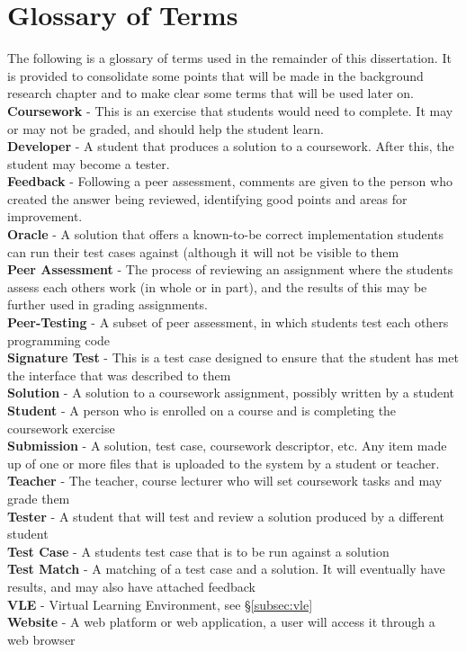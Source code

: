 \documentclass[a4paper,11pt]{report}
\newcommand{\gloss}[2]{\\\textbf{#1} - {#2}}
\begin{document}
\section{Glossary of Terms}
The following is a glossary of terms used in the remainder of this dissertation. It is provided to consolidate some points that will be made in the background research chapter and to make clear some terms that will be used later on.
\gloss{Coursework}{This is an exercise that students would need to complete. It may or may not be graded, and should help the student learn.}
\gloss{Developer}{A student that produces a solution to a coursework. After this, the student may become a tester.}
\gloss{Feedback}{Following a peer assessment, comments are given to the person who created the answer being reviewed, identifying good points and areas for improvement.}
\gloss{Oracle}{A solution that offers a known-to-be correct implementation students can run their test cases against (although it will not be visible to them}
\gloss{Peer Assessment}{The process of reviewing an assignment where the students assess each others work (in whole or in part), and the results of this may be further used in grading assignments.}
\gloss{Peer-Testing}{A subset of peer assessment, in which students test each others programming code}
\gloss{Signature Test}{This is a test case designed to ensure that the student has met the interface that was described to them}
\gloss{Solution}{A solution to a coursework assignment, possibly written by a student}
\gloss{Student}{A person who is enrolled on a course and is completing the coursework exercise}
\gloss{Submission}{A solution, test case, coursework descriptor, etc. Any item made up of one or more files that is uploaded to the system by a student or teacher.}
\gloss{Teacher}{The teacher, course lecturer who will set coursework tasks and may grade them}
\gloss{Tester}{A student that will test and review a solution produced by a different student}
\gloss{Test Case}{A students test case that is to be run against a solution}
\gloss{Test Match}{A matching of a test case and a solution. It will eventually have results, and may also have attached feedback}
\gloss{VLE}{Virtual Learning Environment, see \S\ref{subsec:vle}}
\gloss{Website}{A web platform or web application, a user will access it through a web browser}
\end{document}
